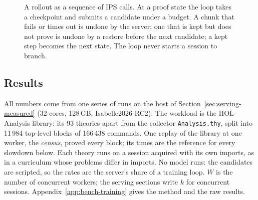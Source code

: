 \documentclass[11pt]{article}
\newcommand{\code}[1]{\colorbox{gray!12}{\texttt{\vphantom{Ag}#1}}}
\begin{document}
\begin{figure}[!htb]
\centering
{}
\caption{A rollout as a sequence of IPS calls. At a proof state the loop
  takes a checkpoint and submits a candidate under a budget. A chunk that
  fails or times out is undone by the server; one that is kept but does
  not prove is undone by a restore before the next candidate; a kept step
  becomes the next state. The loop never starts a session to branch.}
\label{fig:rollout}
\end{figure}

\subsection{Results}
\label{sec:training-measured}

All numbers come from one series of runs on the host of
Section~\ref{sec:serving-measured} (32 cores, 128\,GB, Isabelle2026-RC2).
The workload is the HOL-Analysis library: its 93 theories apart from the
collector \code{Analysis.thy}, split into 11\,984 top-level blocks of
166\,438 commands. One replay of the library at one worker, the
\emph{census}, proved every block; its times are the reference for every
slowdown below. Each theory runs on a session acquired with its own
imports, as in a curriculum whose problems differ in imports. No model
runs: the candidates are scripted, so the rates are the server's share of
a training loop. $W$ is the number of concurrent workers; the serving
sections write $k$ for concurrent sessions. Appendix~\ref{app:bench-training}
gives the method and the raw results.
\end{document}
